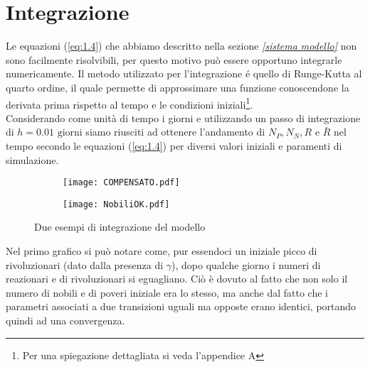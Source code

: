 \section{Integrazione}
Le equazioni (\ref{eq:1.4}) che abbiamo descritto nella sezione \emph{\ref{sistema modello}} non sono facilmente risolvibili, per questo motivo può essere opportuno integrarle numericamente. Il metodo utilizzato per l'integrazione é quello di Runge-Kutta al quarto ordine, il quale permette di approssimare una funzione conoscendone la derivata prima rispetto al tempo e le condizioni iniziali\footnote{Per una spiegazione dettagliata si veda l'appendice A}. \\
Considerando come unità di tempo i giorni e utilizzando un passo di integrazione di $ h=0.01 \text{ giorni}$ siamo riusciti ad ottenere l'andamento di $ N_{P}, N_{N}, R$ e $\bar{R} $ nel tempo secondo le equazioni (\ref{eq:1.4}) per diversi valori iniziali e paramenti di simulazione.
\begin{figure}[H]
	\centering
	\begin{subfigure}[H]{0.49\textwidth}
		\centering
		\texttt{[image: COMPENSATO.pdf]}
	\end{subfigure}
	\hfill
	\begin{subfigure}[H]{0.49\textwidth}
		\centering
		\texttt{[image: NobiliOK.pdf]}
	\end{subfigure}
\caption{Due esempi di integrazione del modello}
\end{figure}
Nel primo grafico si può notare come, pur essendoci un iniziale picco di rivoluzionari (dato dalla presenza di $ \gamma $), dopo qualche giorno i numeri di reazionari e di rivoluzionari si eguagliano. Ciò è dovuto al fatto che non solo il numero di nobili e di poveri iniziale era lo stesso, ma anche dal fatto che i parametri associati a due transizioni uguali ma opposte erano identici, portando quindi ad una convergenza.

